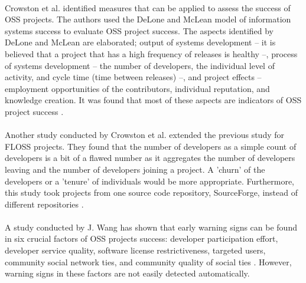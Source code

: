 \paragraph{}
Crowston et al. identified measures that can be applied to assess the success of
OSS projects. The authors used the DeLone and McLean model of information
systems success to evaluate OSS project success. The aspects identified by
DeLone and McLean are elaborated; output of systems development -- it is
believed that a project that has a high frequency of releases is healthy --,
process of systems development -- the number of developers, the individual
level of activity, and cycle time (time between releases) --, and
project effects -- employment opportunities of the contributors, individual
reputation, and knowledge creation. It was found that most of these aspects are
indicators of OSS project success \cite{crowston2003}.

\paragraph{}
Another study conducted by Crowston et al. extended the previous study for
FLOSS projects. They found that the number of developers as a simple count of
developers is a bit of a flawed number as it aggregates the number of
developers leaving and the number of developers joining a project. A 'churn' of
the developers or a 'tenure' of individuals would be more appropriate.
Furthermore, this study took projects from one source code repository,
SourceForge, instead of different repositories \cite{crowston2006}.

\paragraph{}
A study conducted by J. Wang has shown that early warning signs can be found in
six crucial factors of OSS projects success: developer participation effort, developer
service quality, software license restrictiveness, targeted users, community
social network ties, and community quality of social ties \cite{wang2012}.
However, warning signs in these factors are not easily detected automatically.


\begin{comment}
This chapter contains all the information needed to put the thesis into
context. It is common to use (a revised version) of your literature survey for
this purpose.
It is important to refer from your text to sources you have used, as listed in
your bibliography section (appendix). For example, “XP is a recent agile
development method [1]” is a common style of doing this, where the following
entry would be included in your bibliography:
[1] K. Beck, E. Gamma, Test infected: Programmers love writing tests, Java
Report 3 (7) (1998) 51–56.
If you want to refer to books you have read as part of the curriculum, you can
also do so in this way.
Have a look at Chapter 2 of this example thesis at Paul’s
homepage\footnote{http://homepages.cwi.nl/~paulk/thesesMasterSoftwareEngineering/2006/RichardKettelerij.pdf}.
\end{comment}